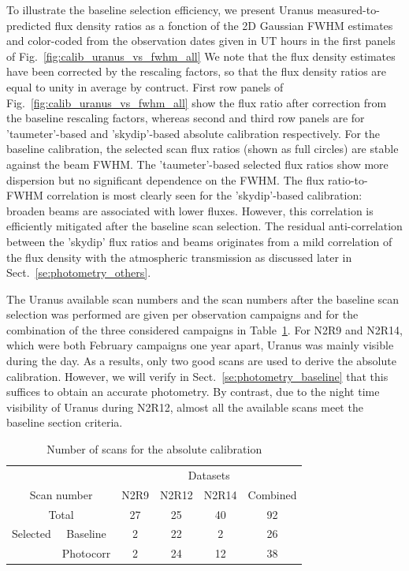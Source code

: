 To illustrate the baseline selection efficiency, we present Uranus
measured-to-predicted flux density ratios as a fonction of the 2D
Gaussian FWHM estimates and color-coded from the observation dates
given in UT hours in the first panels of
Fig.~\ref{fig:calib_uranus_vs_fwhm_all}
We note that the flux density estimates have been corrected by the
rescaling factors, so that the flux density ratios are equal to unity
in average by contruct. First row panels of
Fig.~\ref{fig:calib_uranus_vs_fwhm_all} show the flux ratio after
correction from the baseline rescaling factors, whereas second and
third row panels are for 'taumeter'-based and 'skydip'-based absolute
calibration respectively. For the baseline calibration, the selected
scan flux ratios (shown as full circles) are stable against the beam
FWHM. The 'taumeter'-based selected flux ratios show more dispersion
but no significant dependence on the FWHM. The flux ratio-to-FWHM
correlation is most clearly seen for the 'skydip'-based calibration:
broaden beams are associated with lower fluxes. However, this
correlation is efficiently mitigated after the baseline scan
selection. The residual anti-correlation between
the 'skydip' flux ratios and beams originates from a mild
correlation of the flux density with the atmospheric transmission as
discussed later in Sect.~\ref{se:photometry_others}. 

The Uranus available scan numbers and the scan numbers after the baseline scan
selection was performed are given per observation campaigns and for
the combination of the three considered campaigns in
Table~\ref{tab:absolute_calibration_scan_numbers}. For N2R9 and N2R14,
which were both February campaigns one year apart, Uranus was mainly
visible during the day. As a results, only two good scans are used to
derive the absolute calibration. However, we will verify in
Sect.~\ref{se:photometry_baseline} that this suffices to obtain an
accurate photometry. By contrast, due to the night time visibility of
Uranus during N2R12, almost all the available scans meet the baseline
section criteria. 


\begin{table}[th]
\begin{center}
\begin{tabular}{|c|c|c|c|c|c|}
  \hline
  \multicolumn{2}{|c|}{}            &  \multicolumn{4}{|c|}{Datasets} \\\cline{3-6}
  \multicolumn{2}{|c|}{Scan number} &  N2R9  & N2R12  &  N2R14  &  Combined \\
  \hline\hline
  \multicolumn{2}{|c|}{Total}       &   27   &   25    &   40    &    92  \\
  \hline
  Selected & Baseline               &   2    &   22    &    2    &    26  \\
           & Photocorr              &   2    &   24    &   12    &    38  \\
\hline\hline
\end{tabular}
\caption[Absolute calibration scan numbers]{Number of scans for the absolute calibration}
\label{tab:absolute_calibration_scan_numbers}
\end{center}
\end{table}


